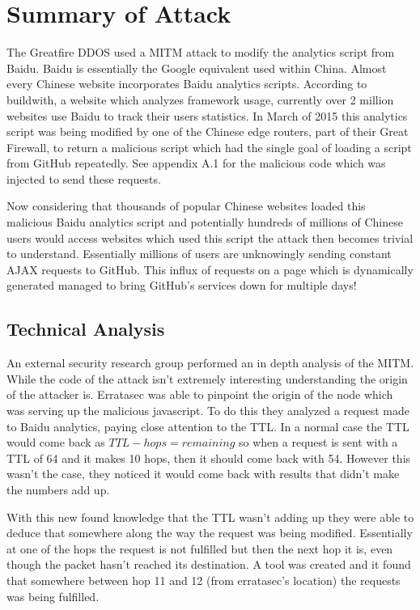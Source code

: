 \documentclass[fleqn, 12pt]{article}
\begin{document}
\section{Summary of Attack}

The Greatfire DDOS used a MITM attack to modify the analytics script from Baidu. Baidu is essentially the Google equivalent used within China. Almost every Chinese website incorporates Baidu analytics scripts. According to buildwith, a website which analyzes framework usage, currently over 2 million websites use Baidu to track their users statistics. \cite{analytics} In March of 2015 this analytics script was being modified by one of the Chinese edge routers, part of their Great Firewall, to return a malicious script which had the single goal of loading a script from GitHub repeatedly. See appendix A.1 for the malicious code which was injected to send these requests.

Now considering that thousands of popular Chinese websites loaded this malicious Baidu analytics script and potentially hundreds of millions of Chinese users would access websites which used this script the attack then becomes trivial to understand. Essentially millions of users are unknowingly sending constant AJAX requests to GitHub. This influx of requests on a page which is dynamically generated managed to bring GitHub's services down for multiple days! \cite{github}

\subsection{Technical Analysis}

An external security research group performed an in depth analysis of the MITM. While the code of the attack isn't extremely interesting understanding the origin of the attacker is. Erratasec was able to pinpoint the origin of the node which was serving up the malicious javascript. To do this they analyzed a request made to Baidu analytics, paying close attention to the TTL. In a normal case the TTL would come back as $TTL - hops = remaining$ so when a request is sent with a TTL of 64 and it makes 10 hops, then it should come back with 54. However this wasn't the case, they noticed it would come back with results that didn't make the numbers add up.

With this new found knowledge that the TTL wasn't adding up they were able to deduce that somewhere along the way the request was being modified. Essentially at one of the hops the request is not fulfilled but then the next hop it is, even though the packet hasn't reached its destination. A tool was created and it found that somewhere between hop 11 and 12 (from erratasec's location) the requests was being fulfilled.
\end{document}
